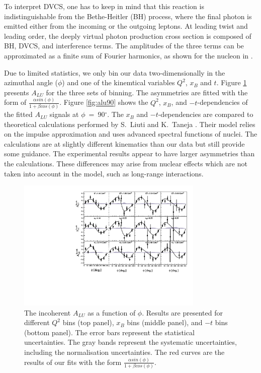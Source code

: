 \documentclass[twocolumn,nofootinbib,showpacs,prl,superscriptaddress,secnumarabic,amssymb,nobibnotes,aps,floatfix]{revtex4}
\begin{document}
To interpret DVCS, one has to keep in mind that this reaction is 
indistinguishable from the Bethe-Heitler (BH) process, where the final photon 
is emitted either from the incoming or the outgoing leptons. At leading twist 
and leading order, the deeply virtual photon production cross section is 
composed of BH, DVCS, and interference terms. The amplitudes of the 
three terms can be approximated as a finite sum of Fourier harmonics, as shown 
for the nucleon in \cite{Belitsky:2001ns}. 

Due to limited statistics, we only bin  our data two-dimensionally 
 in the azimuthal angle ($\phi$) and one of the kinemtical variables 
$Q^{2}$, $x_{B}$ and $t$. Figure \ref{fig:alu} presents $A_{LU}$ for the three
sets of binning. The asymmetries are fitted with the form of $\frac{\alpha 
sin(\phi)}{1+ \beta cos(\phi)}$.  Figure \ref{fig:alu90} shows the $Q^2$, 
$x_{B}$, and $-t$-dependencies of the fitted $A_{LU}$ signals at 
$\phi$~=~90$^{\circ}$. The $x_{B}$ and $-t$-dependencies are compared to 
theoretical calculations performed by S.~Liuti and K.~Taneja 
\cite{simonetta_2}. Their model relies on the impulse approximation and uses 
advanced spectral functions of nuclei.  The calculations are at slightly 
different kinematics than our data but still provide some guidance. The 
experimental results appear to have larger asymmetries than the calculations.  
These differences may arise from nuclear effects which are not taken into 
account in the model, such as long-range interactions.

\begin{figure}[tb]
\includegraphics[width=8.9cm]{figs/incoherent_ALU_phi.pdf}
\caption{The incoherent $A_{LU}$ as a function of $\phi$. Results are presented
   for different $Q^{2}$ bins (top panel), $x_{B}$ bins (middle panel), and 
   $-t$ bins (bottom panel).  The error bars represent the statistical 
uncertainties. The gray bands represent the systematic uncertainties, including 
the normalisation uncertainties. The red curves are the results of our fits 
with the form $\frac{\alpha sin(\phi)}{1+ \beta cos(\phi)}$.}
\label{fig:alu}
\end{figure}
\end{document}
